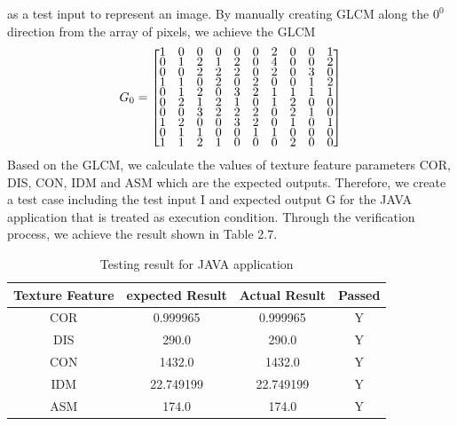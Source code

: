 as a test input to represent an image. By manually creating GLCM along the $0^0$ direction from the array of pixels, we achieve the GLCM
\begin{align*}
G_0 = 
\renewcommand{\arraystretch}{0.5}
\begin{bmatrix}
    1&     0&     0&     0&     0&     0&      2&     0&     0&     1\\
    0&     1&     2&     1&     2&     0&     4&     0&     0&     2\\
    0&     0&     2&     2&     2&     0&     2&     0&     3  &   0\\
    1&     1&     0&     2&     0&     2&     0&     0&     1 &    2\\
    0&     1&     2&     0&     3&     2&     1&     1 &    1  &   1\\
    0 &    2  &   1  &   2   &  1  &   0  &   1 &    2&     0  &   0\\
    0&     0&     3&     2&     2&     2&     0&     2&     1  &   0\\
    1&     2&     0&     0&     3&     2&     0&     1 &    0  &   1\\
    0 &    1  &   1   &  0   &  0  &   1 &    1&     0&     0  &   0\\
    1&     1&     2&     1&     0&     0&     0&     2&     0  &   0
\end{bmatrix}
\end{align*}
Based on the GLCM, we calculate the values of texture feature parameters COR, DIS, CON, IDM and ASM which are the expected outputs. Therefore, we create a test case including the test input I and expected output G for the JAVA application that is treated as execution condition. Through the verification process, we achieve the result shown in Table 2.7. 
\begin{table}[!h]
\begin{center}
\begin{tabular}{|| c | c  c | c ||}
\hline
Texture Feature & expected Result & Actual Result & Passed \\
\hline\hline
COR & 0.999965 & 0.999965 & Y \\
DIS & 290.0 & 290.0 & Y \\
CON & 1432.0 & 1432.0 & Y \\
IDM & 22.749199 & 22.749199 & Y\\
ASM & 174.0 & 174.0 & Y\\
\hline
\end{tabular}
\end{center}
\caption{Testing result for JAVA application}
\end{table}
